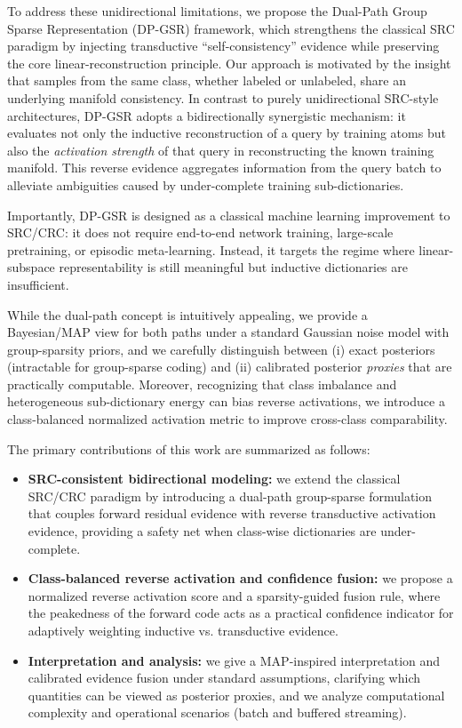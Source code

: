 \documentclass[10pt,comsoc]{IEEEtran}
\begin{document}
To address these unidirectional limitations, we propose the Dual-Path Group Sparse Representation (DP-GSR) framework, which strengthens the classical SRC paradigm by injecting transductive ``self-consistency'' evidence while preserving the core linear-reconstruction principle. Our approach is motivated by the insight that samples from the same class, whether labeled or unlabeled, share an underlying manifold consistency. In contrast to purely unidirectional SRC-style architectures, DP-GSR adopts a bidirectionally synergistic mechanism: it evaluates not only the inductive reconstruction of a query by training atoms but also the \textit{activation strength} of that query in reconstructing the known training manifold. This reverse evidence aggregates information from the query batch to alleviate ambiguities caused by under-complete training sub-dictionaries.

Importantly, DP-GSR is designed as a classical machine learning improvement to SRC/CRC: it does not require end-to-end network training, large-scale pretraining, or episodic meta-learning. Instead, it targets the regime where linear-subspace representability is still meaningful but inductive dictionaries are insufficient.

While the dual-path concept is intuitively appealing, we provide a Bayesian/MAP view for both paths under a standard Gaussian noise model with group-sparsity priors, and we carefully distinguish between (i) exact posteriors (intractable for group-sparse coding) and (ii) calibrated posterior \emph{proxies} that are practically computable. Moreover, recognizing that class imbalance and heterogeneous sub-dictionary energy can bias reverse activations, we introduce a class-balanced normalized activation metric to improve cross-class comparability.

The primary contributions of this work are summarized as follows:
\begin{itemize}
    \item \textbf{SRC-consistent bidirectional modeling:} we extend the classical SRC/CRC paradigm by introducing a dual-path group-sparse formulation that couples forward residual evidence with reverse transductive activation evidence, providing a safety net when class-wise dictionaries are under-complete.
    \item \textbf{Class-balanced reverse activation and confidence fusion:} we propose a normalized reverse activation score and a sparsity-guided fusion rule, where the peakedness of the forward code acts as a practical confidence indicator for adaptively weighting inductive vs. transductive evidence.
    \item \textbf{Interpretation and analysis:} we give a MAP-inspired interpretation and calibrated evidence fusion under standard assumptions, clarifying which quantities can be viewed as posterior proxies, and we analyze computational complexity and operational scenarios (batch and buffered streaming).
\end{itemize}
\end{document}
